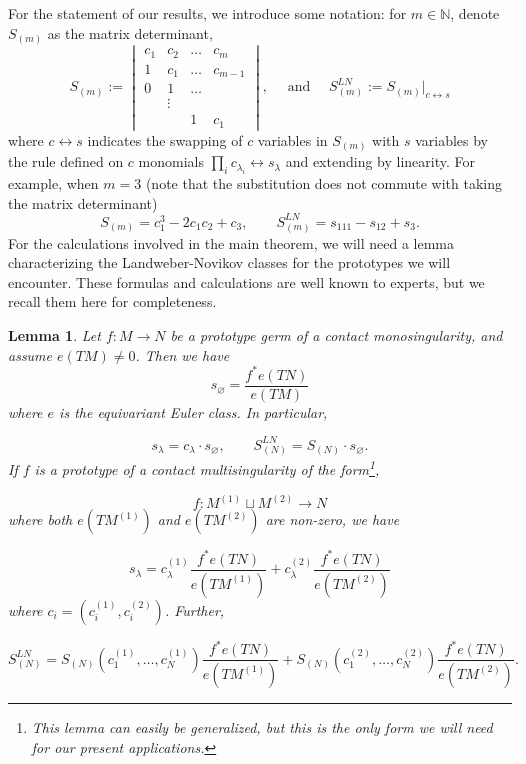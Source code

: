 \documentclass[11pt]{article}
\theoremstyle{plain}
\newtheorem{lemma}[fact]{Lemma}
\theoremstyle{definition}
\theoremstyle{definition}
\newcounter{equation}
\let\emptyset\varnothing
\begin{document}
For the statement of our results, we introduce some notation: for $m \in \mathbb N$, denote $S_{(m)}$ as the matrix determinant,
\[
S_{(m)} :=\begin{vmatrix}c_1 & c_2 & \dots&c_{m}\\ 1 & c_1 & \dots&c_{m-1}\\0&1&\dots\\ & \vdots & \\
&&1&c_1\end{vmatrix},\quad \text{ and }  \quad S_{(m)}^{LN} := S_{(m)}\Big|_{c\leftrightarrow s}
\]
where $c\leftrightarrow s$ indicates the swapping of $c$ variables in $S_{(m)}$ with $s$ variables by the rule defined on $c$ monomials $\prod_ic_{\lambda_i} \leftrightarrow s_\lambda$ and extending by linearity. For example, when $m=3$ (note that the substitution does not commute with taking the matrix determinant)
\[
S_{(m)}= c_1^3-2c_1c_2+c_3, \quad \quad S^{LN}_{(m)} = s_{111}-s_{12}+s_3.
\]
For the calculations involved in the main theorem, we will need a lemma characterizing the Landweber-Novikov classes for the prototypes we will encounter. These formulas and calculations are well known to experts, but we recall them here for completeness. 

\begin{lemma}\label{LN classes}
Let $f: M \to N$ be a prototype germ of a contact monosingularity, and assume $e(TM)\ne 0$. Then we have
\begin{equation}\label{LN-classes-germ}
s_\emptyset = \frac{f^*e(TN)}{e(TM)}
\end{equation}
where $e$ is the equivariant Euler class. In particular,

\begin{equation}\label{LN-classes-germ-corr}
s_\lambda = c_\lambda \cdot s_\emptyset,\quad\quad S_{(N)}^{LN}=S_{(N)}\cdot s_\emptyset.
\end{equation}
If $f$ is a prototype of a contact multisingularity of the form\footnote{This lemma can easily be generalized, but this is the only form we will need for our present applications.}, 

\[
f: M^{(1)}\sqcup M^{(2)}\to N
\]
where both $e(TM^{(1)})$ and $e(TM^{(2)})$ are non-zero, we have

\begin{equation}\label{LN-classes-multigerm}
s_\lambda = c_\lambda^{(1)}\frac{f^*e(TN)}{e(TM^{(1)})} + c_\lambda^{(2)} \frac{f^*e(TN)}{e(TM^{(2)})}
\end{equation}
where $c_i=(c_i^{(1)},c_i^{(2)})$. Further,

\begin{equation}\label{LN-classes-multigerm-corr}
S^{LN}_{(N)} = S_{(N)}\left(c^{(1)}_1,\dots,c_N^{(1)}\right)\frac{f^*e(TN)}{e(TM^{(1)})} + S_{(N)}\left(c^{(2)}_1,\dots,c^{(2)}_N\right)\frac{f^*e(TN)}{e(TM^{(2)})}.
\end{equation}
\end{lemma}
\end{document}
